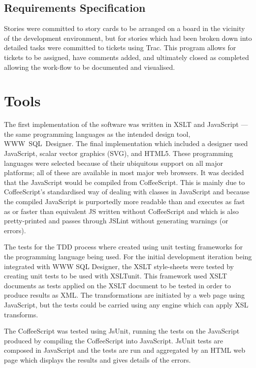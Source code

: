 \subsection*{Requirements Specification}
Stories were committed to story cards to be arranged on a board in the vicinity of the development environment, but for stories which had been broken down into detailed tasks were committed to tickets using Trac. This program allows for tickets to be assigned, have comments added, and ultimately closed as completed allowing the work-flow to be documented and visualised.

\section{Tools}
The first implementation of the software was written in XSLT and JavaScript --- the same programming languages as the intended design tool, \mbox{WWW SQL Designer}. The final implementation which included a designer used JavaScript, scalar vector graphics (SVG), and HTML5. These programming languages were selected because of their ubiquitous support on all major platforms; all of these are available in most major web browsers. It was decided that the Java\-Script would be compiled from Coffee\-Script. This is mainly due to Coffee\-Script's standardised way of dealing with classes in Java\-Script and because the compiled Java\-Script is purportedly more readable than and executes as fast as or faster than equivalent JS written without Coffee\-Script and which is also pretty-printed and passes through JSLint without generating warnings (or errors).

The tests for the TDD process where created using unit testing frameworks for the programming language being used. For the initial development iteration being integrated with WWW SQL Designer, the XSLT style-sheets were tested by creating unit tests to be used with XSLTunit. This framework used XSLT documents as tests applied on the XSLT document to be tested in order to produce results as XML. The transformations are initiated by a web page using Java\-Script, but the tests could be carried using any engine which can apply XSL transforms.

The Coffee\-Script was tested using JsUnit, running the tests on the Java\-Script produced by compiling the Coffee\-Script into Java\-Script. JsUnit tests are composed in Java\-Script and the tests are run and aggregated by an HTML web page which displays the results and gives details of the errors.

